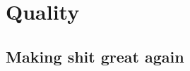 \documentclass[hyperref={pdfpagelabels=false},aspectratio=169]{beamer}
\begin{document}
\section{Quality} 
\subsection{Making shit great again} 
\begin{frame}
\end{frame}
\end{document}
